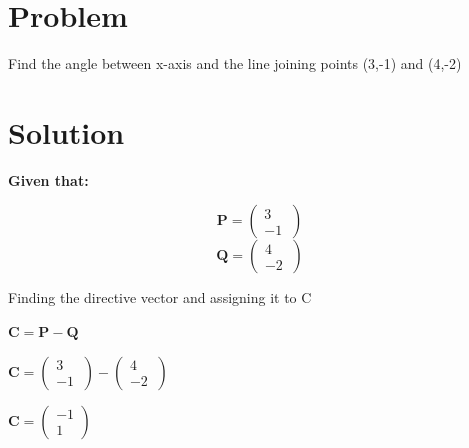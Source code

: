 \documentclass[10pt, a4paper]{article}
\let\vec\mathbf
\begin{document}
\title{\mytitle}
\author{\myauthor\hspace{1em}\\\contact\\FWC22045\hspace{6.5em}IITH\hspace{0.5em}\mymodule\hspace{6em}Matrix:Lines}

\date{}
\maketitle


  \section{Problem}
Find the angle between x-axis and the line joining points (3,-1) and (4,-2)

\section{Solution}
\textbf{Given that:}
\begin{center}


$$\vec{P}=\begin{pmatrix} 3\\ -1\ \end{pmatrix}$$
$$\vec{Q}=\begin{pmatrix} 4\\ -2\ \end{pmatrix}$$
\end{center}
Finding the directive vector and assigning it to C\\
\begin{center}
	$\vec{C}=\vec{P}-\vec{Q}$\\
\end{center}
\begin{center}
	$\vec{C}=\begin{pmatrix} 3\\ -1\ \end{pmatrix} - \begin{pmatrix} 4\\ -2\ \end{pmatrix}$
\end{center}

\begin{center}
$\vec{C}=\begin{pmatrix} -1\\ 1\ \end{pmatrix}$\\
\end{center}
\end{document}
